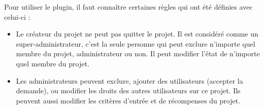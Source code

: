 Pour utiliser le plugin, il faut connaître certaines règles qui ont été définies avec celui-ci :
\begin{itemize}
    \item Le créateur du projet ne peut pas quitter le projet. Il est considéré comme un super-administrateur, c'est la seule personne qui peut exclure n'importe quel membre du projet, administrateur ou non. Il peut modifier l'état de n'importe quel membre du projet.
    \item Les administrateurs peuvent exclure, ajouter des utilisateurs (accepter la demande), ou modifier les droits des autres utilisateurs sur ce projet. Ils peuvent aussi modifier les critères d'entrée et de récompenses du projet.
\end{itemize}
